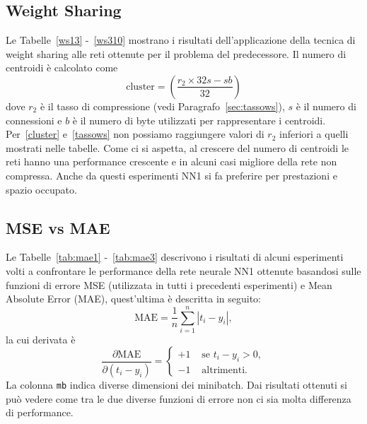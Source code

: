 \documentclass[11pt,a4paper,twoside,
openright]{book}
\begin{document}
\subsection{Weight Sharing}
Le Tabelle~\ref{ws13} -~\ref{ws310} mostrano i risultati dell'applicazione della tecnica di weight sharing alle reti ottenute per il problema del predecessore.
Il numero di centroidi è calcolato come
\begin{equation}
\mathrm{cluster}=\left(\frac{r_2 \times32s -sb}{32}\right)
\label{cluster}
\end{equation}
dove $r_2$ è il tasso di compressione (vedi Paragrafo~\ref{sec:tassows}), $s$ è il numero di connessioni e $b$ è il numero di byte utilizzati per rappresentare i centroidi.
Per~\eqref{cluster} e~\eqref{tassows} non possiamo raggiungere valori di $r_2$ inferiori a quelli mostrati nelle tabelle.
Come ci si aspetta, al crescere del numero di centroidi le reti hanno una performance crescente e in alcuni casi migliore della rete non compressa. Anche da questi esperimenti NN1 si fa preferire per prestazioni e spazio occupato.

\subsection{MSE vs MAE}
\label{secmsemae}
Le Tabelle~\ref{tab:mae1} -~\ref{tab:mae3} descrivono i risultati di alcuni esperimenti volti a confrontare le performance della rete neurale NN1 ottenute basandosi sulle funzioni di errore MSE (utilizzata in tutti i precedenti esperimenti) e Mean Absolute Error (MAE), quest'ultima è descritta in seguito:
\begin{equation}
\mathrm{MAE}=\frac{1}{n}\sum\limits^n_{i=1}|t_i-y_i|,
\label{msemae}
\end{equation}
la cui derivata è
\begin{equation}
\dfrac{\partial \text{MAE}}{\partial (t_i-y_i)} = 
\begin{cases}
  +1& \text{ se } t_i-y_i > 0,\\
  -1& \text{ altrimenti}.
\end{cases}
\end{equation}
La colonna \texttt{mb} indica diverse dimensioni dei minibatch. Dai risultati ottenuti si può vedere come tra le due diverse funzioni di errore non ci sia molta differenza di performance.

\end{document}
